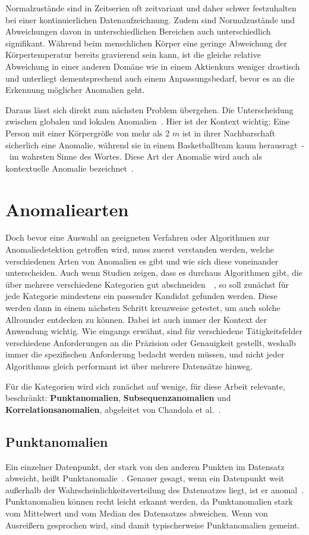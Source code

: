Normalzustände sind in Zeitserien oft zeitvariant und daher schwer festzuhalten bei einer kontinuierlichen Datenaufzeichnung.
Zudem sind Normalzustände und Abweichungen davon in unterschiedlichen Bereichen auch unterschiedlich signifikant. Während beim
menschlichen Körper eine geringe Abweichung der Körpertemperatur bereits gravierend sein kann, ist die gleiche relative Abweichung
in einer anderen Domäne wie in einem Aktienkurs weniger drastisch und unterliegt dementsprechend auch einem Anpassungsbedarf, bevor
es an die Erkennung möglicher Anomalien geht.

Daraus lässt sich direkt zum nächsten Problem übergehen. Die Unterscheidung zwischen globalen und lokalen Anomalien~\cite{Breunig2000}.
Hier ist der Kontext wichtig: Eine Person mit einer Körpergröße von mehr als 2 $m$ ist in ihrer Nachbarschaft sicherlich eine Anomalie,
während sie in einem Basketballteam kaum herausragt~-~im wahrsten Sinne des Wortes. Diese Art der Anomalie wird auch als kontextuelle
Anomalie bezeichnet~\Cite[S.~12]{Wenig2024}.

\section{Anomaliearten}\label{sec:anomaliearten}
Doch bevor eine Auswahl an geeigneten Verfahren oder Algorithmen zur Anomaliedetektion getroffen wird, muss zuerst verstanden werden,
welche verschiedenen Arten von Anomalien es gibt und wie sich diese voneinander unterscheiden.
Auch wenn Studien zeigen, dass es durchaus Algorithmen gibt, die über mehrere verschiedene Kategorien gut
abschneiden~\cite[S.~30~-~31]{Wenig2024}~\cite{Schmidl2022}, so soll zunächst für jede Kategorie mindestens ein passender Kandidat
gefunden werden. Diese werden dann in einem nächsten Schritt kreuzweise getestet, um auch solche Allrounder entdecken zu können. Dabei
ist auch immer der Kontext der Anwendung wichtig. Wie eingangs erwähnt, sind für verschiedene Tätigkeitsfelder verschiedene
Anforderungen an die Präzision oder Genauigkeit gestellt, weshalb immer die spezifischen Anforderung bedacht werden müssen, und nicht
jeder Algorithmus gleich performant ist über mehrere Datensätze hinweg.

Für die Kategorien wird sich zunächst auf wenige, für diese Arbeit relevante, beschränkt: \textbf{Punkt\-anomalien},
\textbf{Subsequenzanomalien} und \textbf{Korrelationsanomalien}, abgeleitet von Chandola et al.~\cite{Chandola2009}.

\subsection{Punktanomalien}\label{sec:punktanomalien}
Ein einzelner Datenpunkt, der stark von den anderen Punkten im Datensatz abweicht, heißt Punkt\-anomalie~\cite{Chandola2009}. Genauer
gesagt, wenn ein Datenpunkt weit außerhalb der Wahrscheinlichkeitsverteilung des Datensatzes liegt, ist er anomal~\Cite[Kap.~10]{Tan2014}.
Punktanomalien können recht leicht erkannt werden, da Punktanomalien stark vom Mittelwert und vom Median des Datensatzes abweichen. Wenn
von Ausreißern gesprochen wird, sind damit typischerweise Punktanomalien gemeint.

